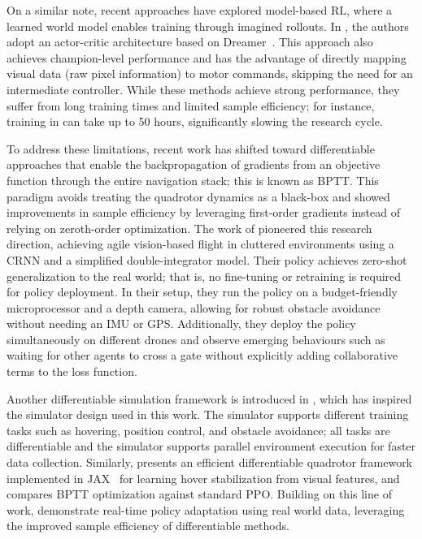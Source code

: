 On a similar note, recent approaches have explored model-based \ac{RL}, where a learned world model enables training through imagined rollouts.
In \cite{romero_dream_2025, verraest_skydreamer_2025}, the authors adopt an actor-critic architecture based on Dreamer~\cite{hafner_mastering_2024}.
This approach also achieves champion-level performance and has the advantage of directly mapping visual data (raw pixel information) to motor commands, skipping the need for an intermediate controller.
While these methods achieve strong performance, they suffer from long training times and limited sample efficiency; for instance, training in \cite{verraest_skydreamer_2025} can take up to 50 hours, significantly slowing the research cycle.

To address these limitations, recent work has shifted toward differentiable approaches that enable the backpropagation of gradients from an objective function through the entire navigation stack; this is known as \ac{BPTT}.
This paradigm avoids treating the quadrotor dynamics as a black-box and showed improvements in sample efficiency by leveraging first-order gradients instead of relying on zeroth-order optimization.
The work of \cite{zhang_back_2025} pioneered this research direction, achieving agile vision-based flight in cluttered environments using a \ac{CRNN} and a simplified double-integrator model.
Their policy achieves zero-shot generalization to the real world; that is, no fine-tuning or retraining is required for policy deployment.
In their setup, they run the policy on a budget-friendly microprocessor and a depth camera, allowing for robust obstacle avoidance without needing an \ac{IMU} or GPS.
Additionally, they deploy the policy simultaneously on different drones and observe emerging behaviours such as waiting for other agents to cross a gate without explicitly adding collaborative terms to the loss function.

Another differentiable simulation framework is introduced in \cite{zhang_diffaero_2025}, which has inspired the simulator design used in this work.
The simulator supports different training tasks such as hovering, position control, and obstacle avoidance; all tasks are differentiable and the simulator supports parallel environment execution for faster data collection.
Similarly, \cite{heeg_learning_2025} presents an efficient differentiable quadrotor framework implemented in JAX~\cite{jax2018github} for learning hover stabilization from visual features, and compares \ac{BPTT} optimization against standard \ac{PPO}.
Building on this line of work, \cite{pan_learning_2026, ren_learning_2026} demonstrate real-time policy adaptation using real world data, leveraging the improved sample efficiency of differentiable methods.


